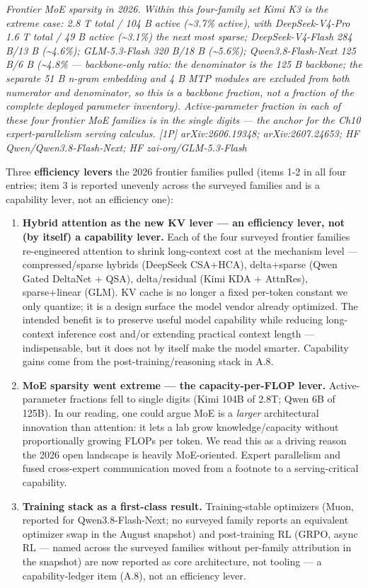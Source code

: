 \emph{Frontier MoE sparsity in 2026. Within this four-family set Kimi K3
is the extreme case: 2.8 T total / 104 B active (\textasciitilde3.7\%
active), with DeepSeek-V4-Pro 1.6 T total / 49 B active
(\textasciitilde3.1\%) the next most sparse; DeepSeek-V4-Flash 284 B/13
B (\textasciitilde4.6\%); GLM-5.3-Flash 320 B/18 B
(\textasciitilde5.6\%); Qwen3.8-Flash-Next 125 B/6 B
(\textasciitilde4.8\% --- \emph{backbone-only ratio}: the denominator is
the 125 B backbone; the separate 51 B n-gram embedding and 4 B MTP
modules are excluded from both numerator and denominator, so this is a
\emph{backbone} fraction, not a fraction of the complete deployed
parameter inventory). Active-parameter fraction in each of these four
frontier MoE families is in the single digits --- the anchor for the
Ch10 expert-parallelism serving calculus. \mbox{{[}1P{]}} arXiv:2606.19348;
arXiv:2607.24653; HF Qwen/Qwen3.8-Flash-Next; HF zai-org/GLM-5.3-Flash}

Three \textbf{efficiency levers} the 2026 frontier families pulled
(items 1-2 in all four entries; item 3 is reported unevenly across the
surveyed families and is a capability lever, not an efficiency one):

\begin{enumerate}
\def\labelenumi{\arabic{enumi}.}
\tightlist
\item
  \textbf{Hybrid attention as the new KV lever --- an efficiency lever,
  not (by itself) a capability lever.} Each of the four surveyed
  frontier families re-engineered attention to shrink long-context cost
  at the mechanism level --- compressed/sparse hybrids (DeepSeek
  CSA+HCA), delta+sparse (Qwen Gated DeltaNet + QSA), delta/residual
  (Kimi KDA + AttnRes), sparse+linear (GLM). KV cache is no longer a
  fixed per-token constant we only quantize; it is a design surface the
  model vendor already optimized. The intended benefit is to preserve
  useful model capability while reducing long-context inference cost
  and/or extending practical context length --- indispensable, but it
  does not by itself make the model smarter. Capability gains come from
  the post-training/reasoning stack in A.8.
\item
  \textbf{MoE sparsity went extreme --- the capacity-per-FLOP lever.}
  Active-parameter fractions fell to single digits (Kimi 104B of 2.8T;
  Qwen 6B of 125B). In our reading, one could argue MoE is a
  \emph{larger} architectural innovation than attention: it lets a lab
  grow knowledge/capacity without proportionally growing FLOPs per
  token. We read this as a driving reason the 2026 open landscape is
  heavily MoE-oriented. Expert parallelism and fused cross-expert
  communication moved from a footnote to a serving-critical capability.
\item
  \textbf{Training stack as a first-class result.} Training-stable
  optimizers (Muon, reported for Qwen3.8-Flash-Next; no surveyed family
  reports an equivalent optimizer swap in the August snapshot) and
  post-training RL (GRPO, async RL --- named across the surveyed
  families without per-family attribution in the snapshot) are now
  reported as core architecture, not tooling --- a capability-ledger
  item (A.8), not an efficiency lever.
\end{enumerate}

